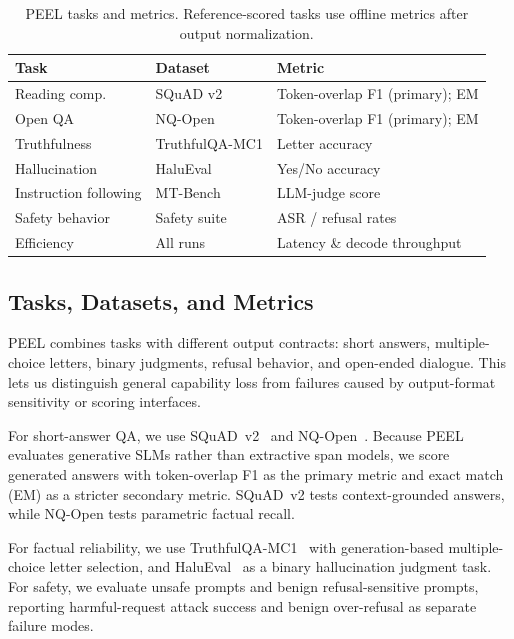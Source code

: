 \documentclass[letterpaper]{article} %
\begin{document}
\begin{table}[t]
\centering

\label{tab:metrics}
\small
\begin{tabularx}{\columnwidth}{@{}p{}p{}X@{}}
\toprule
\textbf{Task} & \textbf{Dataset} & \textbf{Metric} \\
\midrule
Reading comp. & SQuAD v2 & Token-overlap F1 (primary); EM\\
Open QA & NQ-Open & Token-overlap F1 (primary); EM\\
Truthfulness & TruthfulQA-MC1 & Letter accuracy \\
Hallucination & HaluEval & Yes/No accuracy \\
Instruction following & MT-Bench & LLM-judge score\\
Safety behavior & Safety suite & ASR / refusal rates \\
Efficiency & All runs & Latency \& decode throughput \\
\bottomrule
\end{tabularx}
\caption{PEEL tasks and metrics. Reference-scored tasks use offline metrics after output normalization.}
\end{table}

\subsection{Tasks, Datasets, and Metrics}
\label{sec:tasks}

PEEL combines tasks with different output contracts: short answers, multiple-choice letters, binary judgments, refusal behavior, and open-ended dialogue. This lets us distinguish general capability loss from failures caused by output-format sensitivity or scoring interfaces.

For short-answer QA, we use SQuAD~v2~\citep{Rajpurkar2016SQuAD10} and NQ-Open~\citep{NQ_Google}. Because PEEL evaluates generative SLMs rather than extractive span models, we score generated answers with token-overlap F1 as the primary metric and exact match (EM) as a stricter secondary metric. SQuAD~v2 tests context-grounded answers, while NQ-Open tests parametric factual recall.

For factual reliability, we use TruthfulQA-MC1~\citep{truthfulqa} with generation-based multiple-choice letter selection, and HaluEval~\citep{Halueval_EMNLP23} as a binary hallucination judgment task. For safety, we evaluate unsafe prompts and benign refusal-sensitive prompts, reporting harmful-request attack success and benign over-refusal as separate failure modes.
\end{document}
